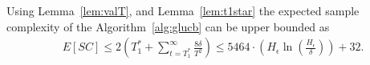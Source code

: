 \thmscglucb*
Using Lemma~\ref{lem:valT}, and Lemma~\ref{lem:t1star}
 the expected sample complexity of the Algorithm~\ref{alg:glucb} can be upper bounded as
 \begin{align}
  & E[SC] \leq 2\left(T_1^* + \sum_{t=T_1^*}^\infty \frac{8\delta}{T^2}\right) \leq 5464\cdot\left(H_\epsilon\ln\left(\frac{H_\epsilon}{\delta}\right)\right) + 32.
 \end{align}
